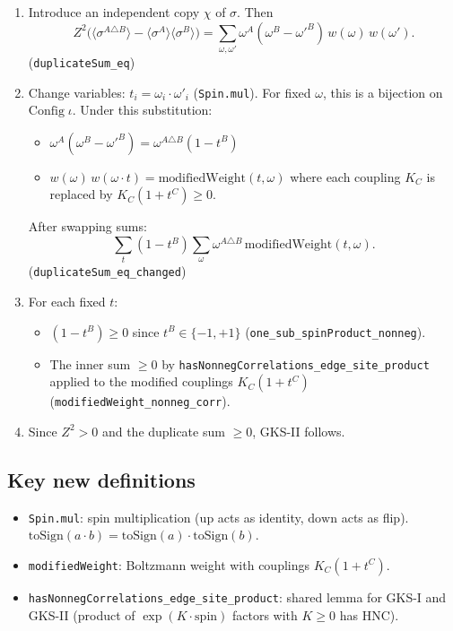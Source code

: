 \documentclass[a4paper,11pt]{article}
\begin{document}
\begin{enumerate}
\item Introduce an independent copy $\chi$ of $\sigma$. Then
  \[
    Z^2\bigl(\langle\sigma^{A\triangle B}\rangle
      - \langle\sigma^A\rangle\langle\sigma^B\rangle\bigr)
    = \sum_{\omega,\omega'} \omega^A(\omega^B - \omega'^B)\,w(\omega)\,w(\omega').
  \]
  (\texttt{duplicateSum\_eq})

\item Change variables: $t_i = \omega_i \cdot \omega'_i$
  (\texttt{Spin.mul}). For fixed $\omega$, this is a bijection on
  $\mathrm{Config}\;\iota$. Under this substitution:
  \begin{itemize}
    \item $\omega^A(\omega^B - \omega'^B) = \omega^{A\triangle B}(1 - t^B)$
    \item $w(\omega)\,w(\omega\cdot t) = \mathrm{modifiedWeight}(t, \omega)$
      where each coupling $K_C$ is replaced by $K_C(1 + t^C) \geq 0$.
  \end{itemize}
  After swapping sums:
  \[
    \sum_t (1 - t^B) \sum_\omega \omega^{A\triangle B}\,
      \mathrm{modifiedWeight}(t, \omega).
  \]
  (\texttt{duplicateSum\_eq\_changed})

\item For each fixed $t$:
  \begin{itemize}
    \item $(1 - t^B) \geq 0$ since $t^B \in \{-1,+1\}$
      (\texttt{one\_sub\_spinProduct\_nonneg}).
    \item The inner sum $\geq 0$ by
      \texttt{hasNonnegCorrelations\_edge\_site\_product} applied to
      the modified couplings $K_C(1 + t^C)$
      (\texttt{modifiedWeight\_nonneg\_corr}).
  \end{itemize}

\item Since $Z^2 > 0$ and the duplicate sum $\geq 0$, GKS-II follows.
\end{enumerate}

\subsection{Key new definitions}

\begin{itemize}
  \item \texttt{Spin.mul}: spin multiplication ($\mathrm{up}$ acts as
    identity, $\mathrm{down}$ acts as flip).
    $\mathrm{toSign}(a \cdot b) = \mathrm{toSign}(a) \cdot \mathrm{toSign}(b)$.
  \item \texttt{modifiedWeight}: Boltzmann weight with couplings
    $K_C(1 + t^C)$.
  \item \texttt{hasNonnegCorrelations\_edge\_site\_product}: shared
    lemma for GKS-I and GKS-II (product of $\exp(K \cdot \text{spin})$
    factors with $K \geq 0$ has HNC).
\end{itemize}
\end{document}
